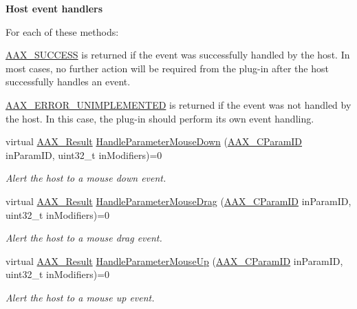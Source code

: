 \begin{Indent}{\bf Host event handlers}
{For each of these methods\+: \begin{DoxyItemize}
\item \hyperlink{a00207_a5f8c7439f3a706c4f8315a9609811937aeddbd1bb67e3a66e6af54a4b4a7a57b3}{A\+A\+X\+\_\+\+S\+U\+C\+C\+E\+S\+S} is returned if the event was successfully handled by the host. In most cases, no further action will be required from the plug-\/in after the host successfully handles an event. \item \hyperlink{a00207_a5f8c7439f3a706c4f8315a9609811937a3b76994b32b97fcd56b19ef8032245df}{A\+A\+X\+\_\+\+E\+R\+R\+O\+R\+\_\+\+U\+N\+I\+M\+P\+L\+E\+M\+E\+N\+T\+E\+D} is returned if the event was not handled by the host. In this case, the plug-\/in should perform its own event handling. \end{DoxyItemize}
}\begin{DoxyCompactItemize}
\item 
virtual \hyperlink{a00149_a4d8f69a697df7f70c3a8e9b8ee130d2f}{A\+A\+X\+\_\+\+Result} \hyperlink{a00117_a75bdb733456034a6dde5eea2043569d4}{Handle\+Parameter\+Mouse\+Down} (\hyperlink{a00149_a1440c756fe5cb158b78193b2fc1780d1}{A\+A\+X\+\_\+\+C\+Param\+I\+D} in\+Param\+I\+D, uint32\+\_\+t in\+Modifiers)=0
\begin{DoxyCompactList}\small\item\em Alert the host to a mouse down event. \end{DoxyCompactList}\item 
virtual \hyperlink{a00149_a4d8f69a697df7f70c3a8e9b8ee130d2f}{A\+A\+X\+\_\+\+Result} \hyperlink{a00117_a86a4b56270153bb8fa38eccd48e3c080}{Handle\+Parameter\+Mouse\+Drag} (\hyperlink{a00149_a1440c756fe5cb158b78193b2fc1780d1}{A\+A\+X\+\_\+\+C\+Param\+I\+D} in\+Param\+I\+D, uint32\+\_\+t in\+Modifiers)=0
\begin{DoxyCompactList}\small\item\em Alert the host to a mouse drag event. \end{DoxyCompactList}\item 
virtual \hyperlink{a00149_a4d8f69a697df7f70c3a8e9b8ee130d2f}{A\+A\+X\+\_\+\+Result} \hyperlink{a00117_a28458b791dc2fede05e64c1e5f596855}{Handle\+Parameter\+Mouse\+Up} (\hyperlink{a00149_a1440c756fe5cb158b78193b2fc1780d1}{A\+A\+X\+\_\+\+C\+Param\+I\+D} in\+Param\+I\+D, uint32\+\_\+t in\+Modifiers)=0
\begin{DoxyCompactList}\small\item\em Alert the host to a mouse up event. \end{DoxyCompactList}\item 

\end{DoxyCompactItemize}
\end{Indent}
